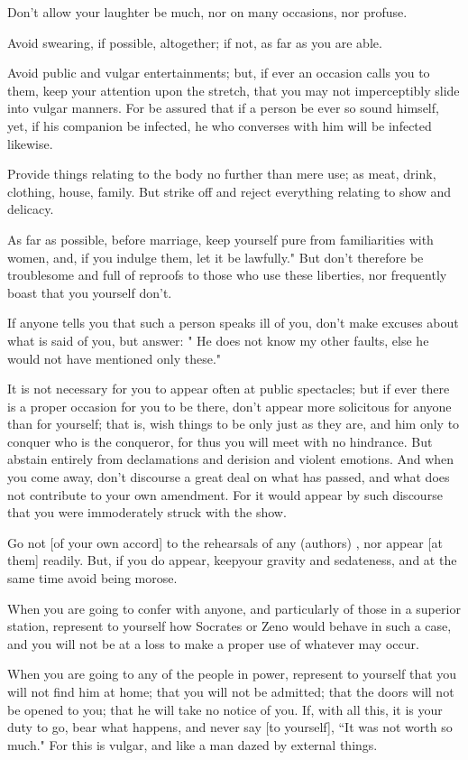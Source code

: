 \documentclass[12pt]{article}
\begin{document}
Don't allow your laughter be much, nor on many occasions, nor profuse.

Avoid swearing, if possible, altogether; if not, as far as you are
able. 

Avoid public and vulgar entertainments; but, if ever an occasion calls
you to them, keep your attention upon the stretch, that you may not
imperceptibly slide into vulgar manners. For be assured that if a
person be ever so sound himself, yet, if his companion be infected,
he who converses with him will be infected likewise. 

Provide things relating to the body no further than mere use; as meat,
drink, clothing, house, family. But strike off and reject everything
relating to show and delicacy. 

As far as possible, before marriage, keep yourself pure from familiarities
with women, and, if you indulge them, let it be lawfully." But don't
therefore be troublesome and full of reproofs to those who use these
liberties, nor frequently boast that you yourself don't.

If anyone tells you that such a person speaks ill of you, don't make
excuses about what is said of you, but answer: " He does not know
my other faults, else he would not have mentioned only these."

It is not necessary for you to appear often at public spectacles;
but if ever there is a proper occasion for you to be there, don't
appear more solicitous for anyone than for yourself; that is, wish
things to be only just as they are, and him only to conquer who is
the conqueror, for thus you will meet with no hindrance. But abstain
entirely from declamations and derision and violent emotions. And
when you come away, don't discourse a great deal on what has passed,
and what does not contribute to your own amendment. For it would appear
by such discourse that you were immoderately struck with the show.

Go not [of your own accord] to the rehearsals of any 
(authors) , nor appear [at them] readily. But, if you do appear, keepyour
gravity and sedateness, and at the same time avoid being morose.

When you are going to confer with anyone, and particularly of those
in a superior station, represent to yourself how Socrates or Zeno
would behave in such a case, and you will not be at a loss to make
a proper use of whatever may occur. 

When you are going to any of the people in power, represent to yourself
that you will not find him at home; that you will not be admitted;
that the doors will not be opened to you; that he will take no notice
of you. If, with all this, it is your duty to go, bear what happens,
and never say [to yourself], ``It was not worth so much." For this
is vulgar, and like a man dazed by external things. 
\end{document}

